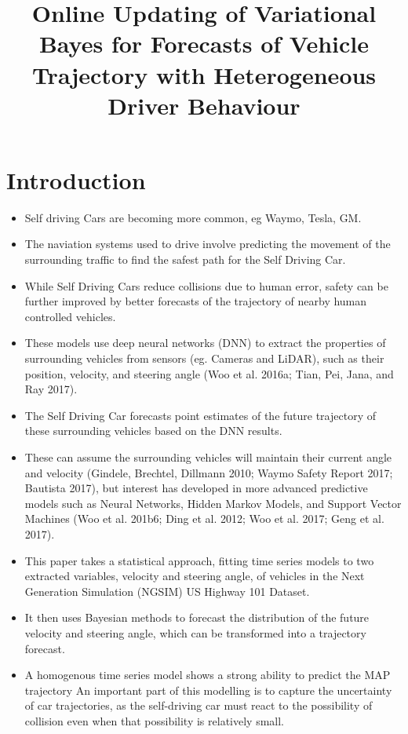 \documentclass[12pt,a4paper]{article}\usepackage[]{graphicx}\usepackage[]{color}
\title{Online Updating of Variational Bayes for Forecasts of Vehicle Trajectory with Heterogeneous Driver Behaviour}
\begin{document}
\maketitle
\section{Introduction}

\begin{itemize}
\item Self driving Cars are becoming more common, eg Waymo, Tesla, GM.
\item The naviation systems used to drive involve predicting the movement of the surrounding traffic to find the safest path for the Self Driving Car.
\item While Self Driving Cars reduce collisions due to human error, safety can be further improved by better forecasts of the trajectory of nearby human controlled vehicles.
\item These models use deep neural networks (DNN) to extract the properties of surrounding vehicles from sensors (eg. Cameras and LiDAR), such as their position, velocity, and steering angle (Woo et al. 2016a; Tian, Pei, Jana, and Ray 2017).
\item The Self Driving Car forecasts point estimates of the future trajectory of these surrounding vehicles based on the DNN results.
\item These can assume the surrounding vehicles will maintain their current angle and velocity (Gindele, Brechtel, Dillmann 2010; Waymo Safety Report 2017; Bautista 2017), but interest has developed in more advanced predictive models such as Neural Networks, Hidden Markov Models, and Support Vector Machines (Woo et al. 201b6; Ding et al. 2012; Woo et al. 2017; Geng et al. 2017).
\item This paper takes a statistical approach, fitting time series models to two extracted variables, velocity and steering angle, of vehicles in the Next Generation Simulation (NGSIM) US Highway 101 Dataset.
\item It then uses Bayesian methods to forecast the distribution of the future velocity and steering angle, which can be transformed into a trajectory forecast.
\item A homogenous time series model shows a strong ability to predict the MAP trajectory
\itme An important part of this modelling is to capture the uncertainty of car trajectories, as the self-driving car must react to the possibility of collision even when that possibility is relatively small.

\end{itemize}
\end{document}
